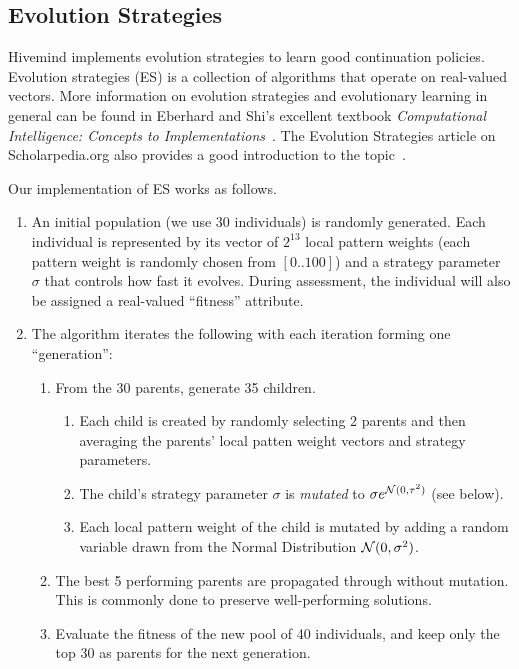 \documentclass{acm_proc_article-sp}
\begin{document}
\subsection{Evolution Strategies}
\label{s:es}

Hivemind implements evolution strategies to learn good continuation policies.
Evolution strategies (ES) is a collection of algorithms that operate on real-valued vectors. 
More information on evolution strategies and evolutionary learning in general can be found in Eberhard and Shi's excellent textbook \emph{Computational Intelligence: Concepts to Implementations}~\cite{eberhart2007computational}. 
The Evolution Strategies article on Scholarpedia.org also provides a good introduction to the topic~\cite{Beyer:2007}.

Our implementation of ES works as follows.
\begin{enumerate}
\item An initial population (we use 30 individuals) is randomly generated. 
Each individual is represented by its vector of $2^{13}$ local pattern weights 
(each pattern weight is randomly chosen from $[0 .. 100]$)
and a strategy parameter $\sigma$ that controls how fast it evolves.
During assessment, the individual will also be assigned a real-valued ``fitness'' attribute.
\item The algorithm iterates the following with each iteration forming one ``generation'':
	\begin{enumerate}
	\item From the 30 parents, generate 35 children.
		\begin{enumerate}
		\item Each child is created by randomly selecting 2 parents and then 
		averaging the parents' local patten weight vectors and strategy parameters.
		\item	The child's strategy parameter $\sigma$ is \emph{mutated} to $\sigma e^{ {\cal N}(0,\tau^2)}$
			(see below).
		\item Each local pattern weight of the child is mutated by adding a random variable drawn from the Normal Distribution
		${\cal N}(0, \sigma^2)$.
		\end{enumerate}
	\item The best 5 performing parents are propagated through without mutation.  This is commonly done to preserve well-performing solutions. 
	\item Evaluate the fitness of the new pool of 40 individuals, and keep only the top 30 as parents for the next generation.
	\end{enumerate}
\end{enumerate}
\end{document}
